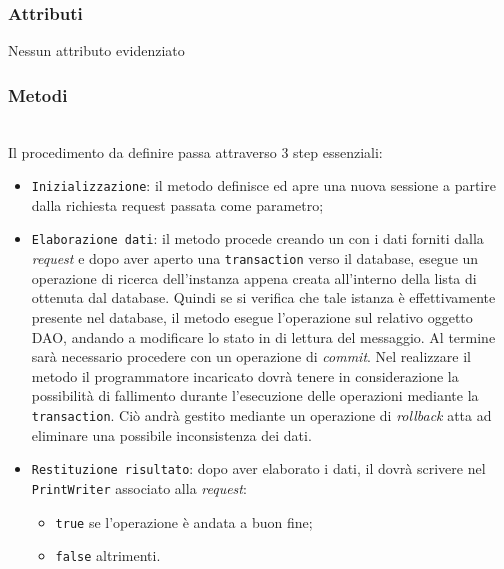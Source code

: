 \subsubsection*{Attributi}

Nessun attributo evidenziato


\subsubsection*{Metodi}
\begin{description}
	\item{}\\
	Il procedimento da definire passa attraverso 3 step essenziali:
	\begin{itemize}
		\item \texttt{Inizializzazione}: il metodo definisce ed apre una nuova sessione a partire dalla richiesta request passata come parametro;
		\item \texttt{Elaborazione dati}: il metodo procede creando un  con i dati forniti dalla \textit{request} e dopo aver aperto una \texttt{transaction} verso il database, esegue un operazione di ricerca dell'instanza appena creata all'interno della lista di  ottenuta dal database. Quindi se si verifica che tale istanza è effettivamente presente nel database, il metodo esegue l'operazione  sul relativo oggetto DAO, andando a modificare lo stato in di lettura del messaggio. Al termine sarà necessario procedere con un operazione di \textit{commit}. Nel realizzare il metodo il programmatore incaricato dovrà tenere in considerazione la possibilità di fallimento durante l'esecuzione delle operazioni mediante la \texttt{transaction}. Ciò andrà gestito mediante un operazione di \textit{rollback} atta ad eliminare una possibile inconsistenza dei dati.
		\item \texttt{Restituzione risultato}: dopo aver elaborato i dati, il  dovrà scrivere nel \texttt{PrintWriter} associato alla \textit{request}:
			\begin{itemize}
				\item \texttt{true} se l'operazione è andata a buon fine;
				\item \texttt{false} altrimenti.
			\end{itemize}
	\end{itemize}

\end{description}

